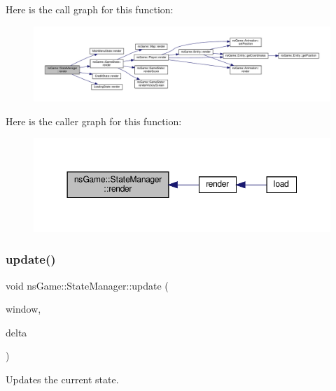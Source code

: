 Here is the call graph for this function\+:\nopagebreak
\begin{figure}[H]
\begin{center}
\leavevmode
\includegraphics[width=350pt]{classns_game_1_1_state_manager_a6f5b564dbd4e84529a125aca38f4339d_cgraph}
\end{center}
\end{figure}
Here is the caller graph for this function\+:\nopagebreak
\begin{figure}[H]
\begin{center}
\leavevmode
\includegraphics[width=350pt]{classns_game_1_1_state_manager_a6f5b564dbd4e84529a125aca38f4339d_icgraph}
\end{center}
\end{figure}
\mbox{\label{classns_game_1_1_state_manager_ab9c5e47745b79af657c08adcc8607475}} 
\subsubsection{\texorpdfstring{update()}{update()}}
{\footnotesize\ttfamily void ns\+Game\+::\+State\+Manager\+::update (\begin{DoxyParamCaption}\item[{Min\+GL \&}]{window,  }\item[{unsigned}]{delta }\end{DoxyParamCaption})}



Updates the current state. 




